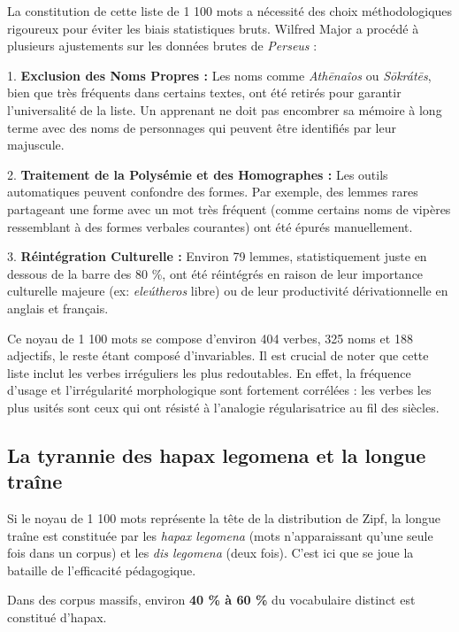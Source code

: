 {La constitution de cette liste de 1 100 mots a nécessité des choix méthodologiques rigoureux pour
éviter les biais statistiques bruts. Wilfred Major a procédé à plusieurs ajustements sur les données
brutes de \textit{Perseus} :

1. \textbf{Exclusion des Noms Propres :} Les noms comme \textit{Athēnaîos} ou \textit{Sōkrátēs},
bien que très fréquents dans certains textes, ont été retirés pour garantir l'universalité de la
liste. Un apprenant ne doit pas encombrer sa mémoire à long terme avec des noms de personnages qui
peuvent être identifiés par leur majuscule.\cite{III-1-1-ref7}

2. \textbf{Traitement de la Polysémie et des Homographes :} Les outils automatiques peuvent
confondre des formes. Par exemple, des lemmes rares partageant une forme avec un mot très fréquent
(comme certains noms de vipères ressemblant à des formes verbales courantes) ont été épurés
manuellement.\cite{III-1-1-ref7}

3. \textbf{Réintégration Culturelle :} Environ 79 lemmes, statistiquement juste en dessous de la
barre des 80 \%, ont été réintégrés en raison de leur importance culturelle majeure (ex:
\textit{eleútheros} \- libre) ou de leur productivité dérivationnelle en anglais et
français.\cite{III-1-1-ref7}

Ce noyau de 1 100 mots se compose d'environ 404 verbes, 325 noms et 188 adjectifs, le reste étant
composé d'invariables.\cite{III-1-1-ref6} Il est crucial de noter que cette liste inclut les verbes
irréguliers les plus redoutables. En effet, la fréquence d'usage et l'irrégularité morphologique
sont fortement corrélées : les verbes les plus usités sont ceux qui ont résisté à l'analogie
régularisatrice au fil des siècles.\cite{III-1-1-ref14}



\subsection{La tyrannie des hapax legomena et la longue traîne}

Si le noyau de 1 100 mots représente la \og tête\fg{} de la distribution de Zipf, la \og longue
traîne\fg{} est constituée par les \textit{hapax legomena} (mots n'apparaissant qu'une seule fois
dans un corpus) et les \textit{dis legomena} (deux fois). C'est ici que se joue la bataille de
l'efficacité pédagogique.

Dans des corpus massifs, environ \textbf{40 \% à 60 \%} du vocabulaire distinct est constitué
d'hapax.\cite{III-1-1-ref3}

}
